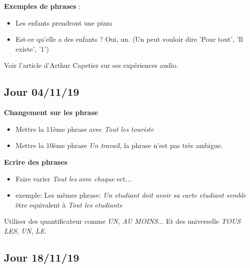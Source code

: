 \documentclass[11pt,letterpaper]{article}
\begin{document}
\textbf{Exemples de phrases} :
\begin{itemize}
    \item Les enfants prendront une pizza
    \item Est-ce qu'elle a des enfants ? Oui, un. (Un peut vouloir dire 'Pour tout', 'Il existe', '1')
\end{itemize} \vspace{5mm}

Voir l'article d'Arthur Capetier sur ses expériences audio. \vspace{5mm}

\newpage
\subsection{Jour 04/11/19}

\textbf{Changement sur les phrase}

\begin{itemize}
    \item Mettre la 11ème phrase avec \textit{Tout les touriste}
    \item Mettre la 10ème phrase \textit{Un travail}, la phrase n'est pas très ambigue.
\end{itemize} 

\vspace{5mm}
\textbf{Ecrire des phrases}
\begin{itemize}
    \item Faire varier \textit{Tout les} avec \textit{chaque} ect...
    \item exemple: Les mêmes phrase: \textit{Un etudiant doit avoir sa carte etudiant semble} être equivalent à \textit{Tout les etudiants}
\end{itemize}
Utiliser des quantificateur comme \textit{UN}, \textit{AU MOINS}... Et des universelle \textit{TOUS LES}, \textit{UN}, \textit{LE}.

\newpage
\subsection{Jour 18/11/19}
\end{document}
